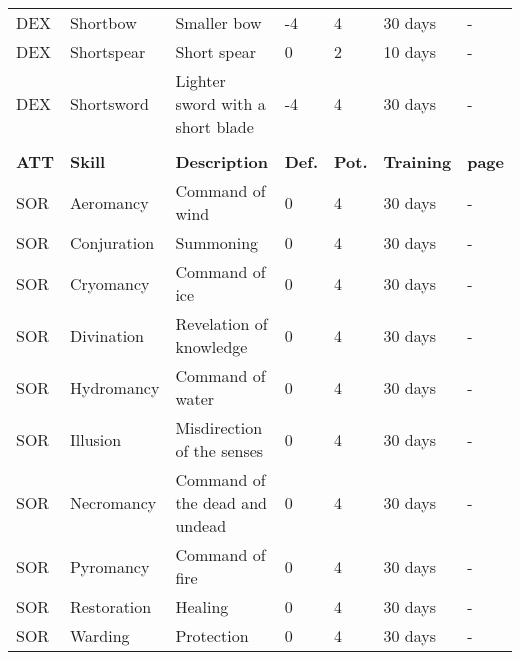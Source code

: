 \begin{center}
\begin{xltabular}{\textwidth}{l l X l l l l}
        DEX & Shortbow & Smaller bow & -4 & 4 & 30 days & - \\ %
        DEX & Shortspear & Short spear & 0 & 2 & 10 days & - \\
        DEX & Shortsword & Lighter sword with a short blade & -4 & 4 & 30 days & - \\
         \\*
        \textbf{ATT} & \textbf{Skill} & \textbf{Description} & \textbf{Def.} & \textbf{Pot.} & \textbf{Training} & \textbf{page} \\*
        SOR & Aeromancy & Command of wind & 0 & 4 & 30 days & - \\
        SOR & Conjuration & Summoning & 0 & 4 & 30 days & - \\
        SOR & Cryomancy & Command of ice & 0 & 4 & 30 days & - \\
        SOR & Divination & Revelation of knowledge & 0 & 4 & 30 days & - \\
        SOR & Hydromancy & Command of water & 0 & 4 & 30 days & - \\
        SOR & Illusion & Misdirection of the senses & 0 & 4 & 30 days & - \\
        SOR & Necromancy & Command of the dead and undead & 0 & 4 & 30 days & - \\
        SOR & Pyromancy & Command of fire & 0 & 4 & 30 days & - \\
        SOR & Restoration & Healing & 0 & 4 & 30 days & - \\
        SOR & Warding & Protection & 0 & 4 & 30 days & - \\
    \end{xltabular}
\end{center}

